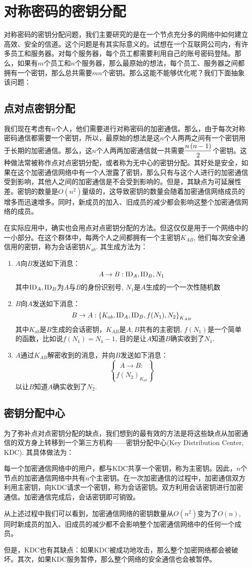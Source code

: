 \section{对称密码的密钥分配}
对称密码的密钥分配问题，我们主要研究的是在一个节点充分多的网络中如何建立高效、安全的信道。这个问题是有其实际意义的。试想在一个互联网公司内，有许多员工和服务器。对每个服务器，每个员工都需要利用自己的账号密码登陆。那么，如果有$m$个员工和$n$个服务器，那么最原始的想法，每个员工、服务器之间都拥有一个密钥，那么总共需要$mn$个密钥。那么这能不能够优化呢？我们下面抽象该问题：
\subsection{点对点密钥分配}
我们现在考虑有$n$个人，他们需要进行对称密码的加密通信。那么，由于每次对称密码通信都需要一个密钥，所以，最原始的想法是这$n$个人两两之间有一个密钥用于长期的加密通信。那么，这$n$个人两两加密通信就一共需要$\displaystyle\frac{n\left( {n-1}\right)}{2}$个密钥。这种做法常被称作点对点密钥分配，或者称为无中心的密钥分配。其好处是安全，如果在这个加密通信网络中有一个人泄露了密钥，那么只有与这个人进行的加密通信受到影响，其他人之间的加密通信是不会受到影响的。但是，其缺点为可延展性差。密钥的数量是$O(n^2)$量级的，这导致密钥的数量会随着加密通信网络成员的增多而迅速增多。同时，新成员的加入、旧成员的减少都会影响这整个加密通信网络的成员。\par
在实际应用中，确实也会用点对点密钥分配的方法。但这仅仅是用于一个网络中的一小部分。在这个群体中，每两个人之间都拥有一个主密钥$K_{AB}$, 他们每次安全通信用的密钥，称为会话密钥$K_{ab}$. 其生成方法为：
\begin{enumerate}
	\item $A$向$B$发送如下消息：
	\[A\to B: \mathrm{ID}_A, \mathrm{ID}_B, N_1\]
	其中$\mathrm{ID}_A, \mathrm{ID}_B$为$A$与$B$的身份识别号, $N_1$是$A$生成的一个一次性随机数
	\item $B$向$A$发送如下消息：
	\[B\to A: \left\{ {K_{ab}, \mathrm{ID}_A, \mathrm{ID}_B, f(N_1), N_2} \right\}_{K_{AB}}\]
	其中$K_{ab}$是$B$生成的会话密钥，$K_{AB}$是$A, B$共有的主密钥, $f(N_1)$是一个简单的函数，比如说$f(N_1)=N_1-1$, 目的是让$A$知道$B$确实收到了$N_1$.
	\item $A$通过$K_{AB}$解密收到的消息，并向$B$发送如下消息：
	\[A\to B:\brace{f(N_2)}_{K_{ab}}\]
	以让$B$知道$A$确实收到了$N_2$.
\end{enumerate}
\subsection{密钥分配中心}
为了弥补点对点密钥分配的缺点，我们想到的最有效的方法是将这些缺点从加密通信的双方身上转移到一个第三方机构——密钥分配中心(Key Distribution Center, KDC). 其具体做法为：\par
每一个加密通信网络中的用户，都与KDC共享一个密钥，称为主密钥。因此，$n$个节点的加密通信网络中共有$n$个主密钥。在一次加密通信的过程中，加密通信双方利用主密钥，向KDC请求一个密钥，称为会话密钥。双方利用会话密钥进行加密通信。加密通信完成后，会话密钥即可销毁。\par
从上述过程中我们可以看到，加密通信网络的密钥数量从$O(n^2)$变为了$O(n)$, 同时新成员的加入、旧成员的减少都不会影响整个加密通信网络中的任何一个成员。\par
但是，KDC也有其缺点：如果KDC被成功地攻击，那么整个加密网络都会被破坏。其次，如果KDC服务暂停，那么整个网络的安全通信也会被暂停。
